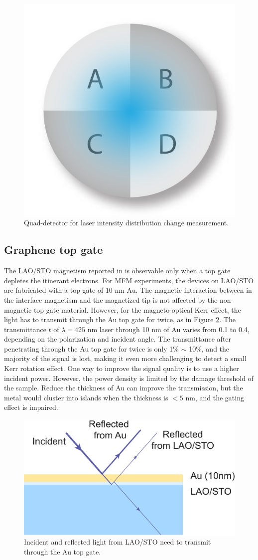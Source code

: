 \documentclass[pdflatex, sectionletters, 12pt, final, phd]{pittetd}    %
\begin{document}
\begin{figure}[h!]
	\centering
	\includegraphics[width=.25\textwidth]{Drawing/Quad.pdf}
	\caption[Quad-detector for laser intensity distribution change measurement]{Quad-detector for laser intensity distribution change measurement.}
	\label{FIG:Quad}
\end{figure}

\subsection{Graphene top gate}

The LAO/STO magnetism reported in \cite{bi2014room} is observable only when a top gate depletes the itinerant electrons. For MFM experiments, the devices on LAO/STO are fabricated with a top-gate of 10 nm Au. The magnetic interaction between in the interface magnetism and the magnetized tip is not affected by the non-magnetic top gate material. However, for the magneto-optical Kerr effect, the light has to transmit through the Au top gate for twice, as in Figure \ref{FIG:KerrTopGate}. The transmittance $t$ of $\lambda = 425$ nm laser through 10 nm of Au varies from 0.1 to 0.4, depending on the polarization and incident angle\cite{smith1986noble}. The transmittance after penetrating through the Au top gate for twice is only 1\% $\sim$ 10\%, and the majority of the signal is lost, making it even more challenging to detect a small Kerr rotation effect. One way to improve the signal quality is to use a higher incident power. However, the power density is limited by the damage threshold of the sample. Reduce the thickness of Au can improve the transmission, but the metal would cluster into islands when the thickness is $< 5$ nm, and the gating effect is impaired.

\begin{figure}[h!]
	\centering	
	\vspace{0.85cm}
	\includegraphics[width=.55\textwidth]{Drawing/KerrTopGate.pdf}
	\caption[Incident and reflected light from LAO/STO]{Incident and reflected light from LAO/STO need to transmit through the Au top gate.}
	\label{FIG:KerrTopGate}
\end{figure}
\end{document}

